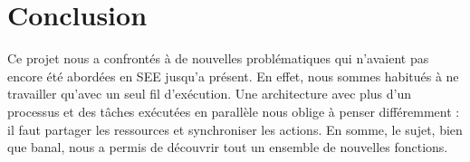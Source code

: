 \documentclass{article}
\begin{document}
	\section{Conclusion}
	\par Ce projet nous a confrontés à de nouvelles problématiques qui n'avaient pas encore été abordées en SEE jusqu'a présent. En effet, nous sommes habitués à ne travailler qu'avec un seul fil d'exécution. Une architecture avec plus d'un processus et des tâches exécutées en parallèle nous oblige à penser différemment : il faut partager les ressources et synchroniser les actions. En somme, le sujet, bien que banal, nous a permis de découvrir tout un ensemble de nouvelles fonctions.

\end{document}
